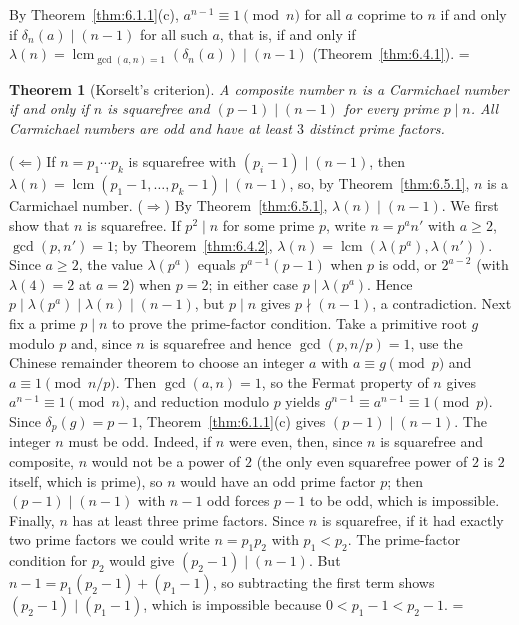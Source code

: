 \documentclass[11pt]{article}
\makeatletter
\let\nt@closedisplay\]
\def\nt@guardedclose{\@ifnextchar\par{\nt@closeafterpar}{\@ifnextchar\end{\postdisplaypenalty\@M\nt@closedisplay}{\nt@closedisplay}}}
\def\nt@closeafterpar\par{\@ifnextchar\par{\nt@closeafterpar}{\@ifnextchar\end{\postdisplaypenalty\@M\nt@closedisplay\par}{\nt@closedisplay\par}}}
\renewenvironment{proof}[1][\proofname]{\par
  \pushQED{\qed}\normalfont\topsep\medskipamount\edef\nt@afterproof{\@endparpenalty=\the\@endparpenalty\relax}\@beginparpenalty\@M\@endparpenalty\@M\let\]\nt@guardedclose\trivlist\item[]\textit{#1\@addpunct{.}} \ignorespaces}{\ifvmode\addpenalty\@M\fi\popQED\nt@afterproof\endtrivlist\@endpefalse}
\theoremstyle{ntstyle}
\newtheorem{theorem}{Theorem}[subsection]
\DeclareMathOperator{\lcm}{lcm}
\makeatother
\begin{document}
\begin{proof} By Theorem~\ref{thm:6.1.1}(c), $a^{n-1} \equiv 1 \pmod{n}$ for all $a$ coprime to $n$ if and only if $\delta_n(a) \mid (n-1)$ for all such $a$, that is, if and only if $\lambda(n) = \lcm_{\gcd(a, n)=1}(\delta_n(a)) \mid (n-1)$ (Theorem~\ref{thm:6.4.1}).
\end{proof}

\begin{theorem}[Korselt's criterion]\label{thm:6.5.2}\label{thm:korselt-criterion}
  A composite
  number $n$ is a Carmichael number if and only if $n$ is squarefree
  and $(p-1) \mid (n-1)$ for every prime $p \mid n$. All Carmichael
  numbers are odd and have at least $3$ distinct prime factors.

\end{theorem}

\begin{proof} ($\Leftarrow$) If $n = p_1 \cdots p_k$ is
  squarefree with $(p_i-1) \mid (n-1)$, then $\lambda(n) = \lcm(p_1-1, \ldots, p_k-1) \mid (n-1)$, so, by
  Theorem~\ref{thm:6.5.1}, $n$ is a Carmichael number. ($\Rightarrow$) By Theorem~\ref{thm:6.5.1},
  $\lambda(n) \mid (n-1)$. We first show that $n$ is squarefree. If $p^{2} \mid n$ for
  some prime $p$, write $n = p^{a} n'$ with $a \ge 2$, $\gcd(p, n') = 1$; by Theorem~\ref{thm:6.4.2},
  $\lambda(n) = \lcm(\lambda(p^{a}), \lambda(n'))$. Since $a \ge 2$,
  the value $\lambda(p^{a})$ equals $p^{a-1}(p-1)$ when $p$ is odd, or $2^{a-2}$
  (with $\lambda(4)=2$ at $a=2$) when $p=2$; in either case $p \mid \lambda(p^{a})$. Hence
  $p \mid \lambda(p^{a}) \mid \lambda(n) \mid (n-1)$, but $p \mid n$ gives $p \nmid (n-1)$, a contradiction.
  Next fix a prime $p \mid n$ to prove the prime-factor condition. Take a primitive root $g$ modulo $p$ and, since $n$ is
  squarefree and hence $\gcd(p, n/p) = 1$, use the Chinese remainder
  theorem to choose an integer $a$ with $a \equiv g \pmod{p}$ and $a \equiv 1 \pmod{n/p}$. Then $\gcd(a, n) = 1$,
  so the Fermat property of
  $n$ gives $a^{n-1} \equiv 1 \pmod{n}$, and reduction modulo $p$ yields
  $g^{n-1} \equiv a^{n-1} \equiv 1 \pmod{p}$. Since $\delta_p(g) = p-1$, Theorem~\ref{thm:6.1.1}(c) gives
  $(p-1) \mid (n-1)$. The integer $n$ must be odd. Indeed, if $n$ were even, then, since $n$ is squarefree
  and composite, $n$ would not be a power of $2$ (the only even squarefree
  power of $2$ is $2$ itself, which is prime), so $n$ would have an odd prime
  factor $p$; then $(p-1) \mid (n-1)$ with $n-1$ odd forces $p-1$
  to be odd, which is impossible. Finally, $n$ has at least three prime factors. Since $n$ is squarefree, if it had
  exactly two prime factors we could write $n=p_1p_2$ with $p_1<p_2$.
  The prime-factor condition for $p_2$ would give
  $(p_2-1)\mid(n-1)$. But
  $n-1=p_1(p_2-1)+(p_1-1)$, so subtracting the first term shows
  $(p_2-1)\mid(p_1-1)$, which is impossible because
  $0<p_1-1<p_2-1$.
\end{proof}
\end{document}
